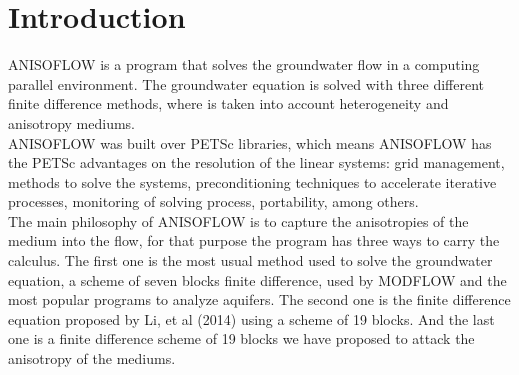 \chapter{Introduction}

ANISOFLOW is a program that solves the groundwater flow in a computing parallel environment. The groundwater equation is solved with three different finite difference methods, where is taken into account heterogeneity and anisotropy  mediums.\\

ANISOFLOW was built over PETSc libraries, which means ANISOFLOW has the PETSc advantages on the resolution of the linear systems: grid management, methods to solve the systems, preconditioning techniques to accelerate iterative processes, monitoring of solving process, portability, among others.\\

The main philosophy of ANISOFLOW is to capture the anisotropies of the medium into the flow, for that purpose the program has three ways to carry the calculus. The first one is the most usual method used to solve the groundwater equation, a scheme of seven blocks finite difference, used by MODFLOW and the most popular programs to analyze aquifers. The second one is the finite difference equation proposed by Li, et al (2014) using a scheme of 19 blocks. And the last one is a finite difference scheme of 19 blocks we have proposed to attack the anisotropy of the mediums. 